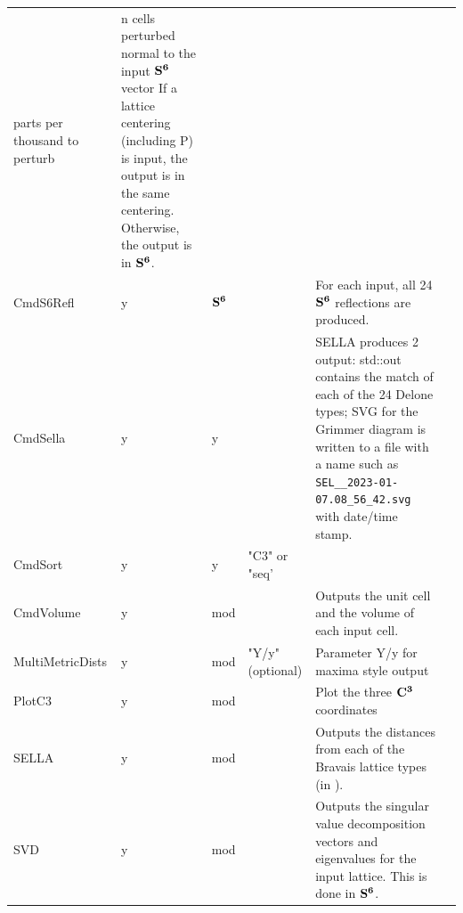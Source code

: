 \documentclass[preprint]{iucr}              %
\numberwithin{equation}{section}
\newcommand{\SVI}[0]{$\bf{S^{6}}$}
\newcommand{\CIII}[0]{$\bf{C^{3}}$}
\begin{document}
\begin{longtable}{l l l p{} p{} l}
				parts per thousand to perturb			&
				n cells perturbed normal to the input \SVI{} vector
				If a lattice centering (including P) is input,
				the output is in the same centering. Otherwise, the output is in \SVI{}.	\\[.9pt]
			CmdS6Refl	&	y	&	\SVI{}	&\hrulefill	&	For each input, 
				all 24 \SVI{} reflections are produced.\\[.9pt]
			CmdSella	&	y	&	y		&\hrulefill	&
				SELLA produces 2 output: std::out contains the match of
				each of the 24 Delone types; SVG for the Grimmer
				diagram is written to a file with a name such as 
					\verb#SEL__2023-01-07.08_56_42.svg# with date/time stamp.\\
			CmdSort		&	y	&	y		&"C3" or "seq'&	\\[.9pt]
			CmdVolume	&	y	&	mod		&\hrulefill	&		Outputs the unit cell 
				and the volume of each input cell.\\[.9pt]
			MultiMetricDists&y	& mod		&"Y/y"(optional)&	
				Parameter Y/y for maxima style output		\\[.9pt]
			PlotC3		&	y	&	mod		& 			& Plot 
				the three \CIII{} coordinates\\[.9pt]
			SELLA		&	y	&	mod		&\hrulefill	&	
				Outputs the distances from each of the Bravais lattice types 
				(in \svi{}).	\\[.9pt]
			SVD			&	y	&	mod		&\hrulefill	& Outputs the singular value decomposition vectors
				and eigenvalues for the input lattice. This is done in \SVI{}.		\\[.9pt]			
			\bottomrule
			
		\end{longtable}
	
\end{document}
